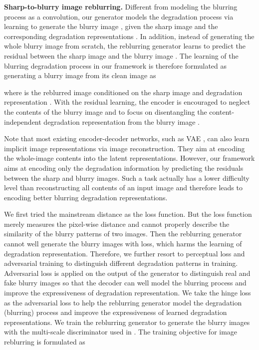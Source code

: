 \documentclass[runningheads]{llncs}
\begin{document}
\noindent\textbf{Sharp-to-blurry image reblurring.} 
Different from modeling the blurring process as a convolution, our generator  models the degradation process via learning to generate the blurry image , given the sharp image  and the corresponding degradation representations . 
In addition, instead of generating the whole blurry image from scratch, the reblurring generator  learns to predict the residual between the sharp image  and the blurry image . 
The learning of the blurring degradation process in our framework is therefore formulated as generating a blurry image  from its clean image  as

where  is the reblurred image conditioned on the sharp image  and degradation representation .
With the residual learning, the encoder  is encouraged to neglect the contents of the blurry image and to focus on disentangling the content-independent degradation representation  from the blurry image .

Note that most existing encoder-decoder networks, such as VAE \cite{VAE}, can also learn implicit image representations via image reconstruction. They aim at encoding the whole-image contents into the latent representations. However, our framework aims at encoding only the degradation information by predicting the residuals between the sharp and blurry images. 
Such a task actually has a lower difficulty level than reconstructing all contents of an input image and therefore leads to encoding better blurring degradation representations.

We first tried the mainstream  distance as the loss function. But the  loss function merely measures the pixel-wise distance and cannot properly describe the similarity of the blurry patterns of two images. Then the reblurring generator  cannot well generate the blurry images with  loss, which harms the learning of degradation representation. 
Therefore, we further resort to perceptual loss \cite{Johnson2016Perceptual} and adversarial training \cite{GAN} to distinguish different degradation patterns in training. 
Adversarial loss is applied on the output of the generator  to distinguish real and fake blurry images so that the decoder can well model the blurring process and improve the expressiveness of degradation representation.
We take the hinge loss \cite{lim2017geometric,SAGAN,SNGAN,park2019SPADE} as the adversarial loss to help the reblurring generator  model the degradation (blurring) process and improve the expressiveness of learned degradation representations. We train the reblurring generator  to generate the blurry images with the multi-scale discriminator  used in \cite{wang2018pix2pixHD}. The training objective for image reblurring is formulated as 
\end{document}
